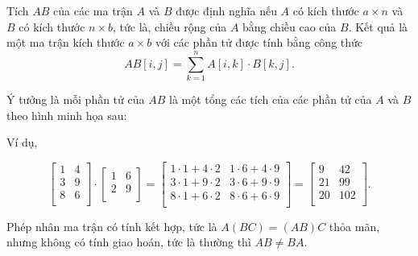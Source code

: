 Tích $AB$ của các ma trận $A$ và $B$
được định nghĩa nếu $A$ có kích thước $a \times n$
và $B$ có kích thước $n \times b$, tức là,
chiều rộng của $A$ bằng chiều cao của $B$.
Kết quả là một ma trận kích thước $a \times b$
với các phần tử được tính bằng công thức
\[
AB[i,j] = \sum_{k=1}^n A[i,k] \cdot B[k,j].
\]

Ý tưởng là mỗi phần tử của $AB$
là một tổng các tích của các phần tử của $A$ và $B$
theo hình minh họa sau:

\begin{center}
\end{center}

Ví dụ,

\[
 \begin{bmatrix}
  1 & 4 \\
  3 & 9 \\
  8 & 6 \\
 \end{bmatrix}
\cdot
 \begin{bmatrix}
  1 & 6 \\
  2 & 9 \\
 \end{bmatrix}
=
 \begin{bmatrix}
  1 \cdot 1 + 4 \cdot 2 & 1 \cdot 6 + 4 \cdot 9 \\
  3 \cdot 1 + 9 \cdot 2 & 3 \cdot 6 + 9 \cdot 9 \\
  8 \cdot 1 + 6 \cdot 2 & 8 \cdot 6 + 6 \cdot 9 \\
 \end{bmatrix}
=
 \begin{bmatrix}
  9 & 42 \\
  21 & 99 \\
  20 & 102 \\
 \end{bmatrix}.
\]

Phép nhân ma trận có tính kết hợp,
tức là $A(BC)=(AB)C$ thỏa mãn,
nhưng không có tính giao hoán,
tức là thường thì $AB \neq BA$.


